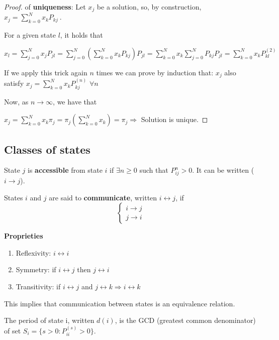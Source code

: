 	\begin{proof} of \textbf{uniqueness}:
		Let $x_j$ be a solution, so, by construction, $x_j = \sum_{k=0}^N x_k P_{kj} ~$.

		For a given state $l$, it holds that

		$x_l = \sum_{j=0}^N x_j P_{jl} =  \sum_{j=0}^N ( \sum_{k=0}^N x_k P_{kj} ) P_{jl} =  \sum_{k=0}^N x_k \sum_{j=0}^N P_{kj} P_{jl} = \sum_{k=0}^N x_k P_{kl}^{(2)}$

		If we apply this trick again $n$ times we can prove by induction that:
		$x_j$ also satisfy $ x_j = \sum_{k=0}^N x_k P_{kj}^(n) $ \quad  $\forall n $

		Now, as $n \to \infty$, we have that

		$x_j = \sum_{k=0}^N x_k \pi_j = \pi_j (\sum_{k=0}^N x_k) = \pi_j  \Rightarrow $ Solution is unique.
	\end{proof}

\subsection{Classes of states}
	\begin{definition}
		State $j$ is {\bfseries accessible} from state $i$ if $\exists n \geq 0$ such that $P_{ij}^n > 0$. It can be written ($i \rightarrow j$).
	\end{definition}

	\begin{definition}
		States $i$ and $j$ are said to {\bfseries communicate}, written $ i \leftrightarrow j$, if
		$$\left\{\begin{matrix}
			i \rightarrow j \\
			j \rightarrow i
			\end{matrix}\right.$$
	\end{definition}

	{\bfseries Proprieties}
	\begin{enumerate}
		\item Reflexivity: \quad $i \leftrightarrow i$
		\item Symmetry: \quad if $i \leftrightarrow j$ then $j \leftrightarrow i$
		\item Transitivity: \quad if $i \leftrightarrow j$ and $j \leftrightarrow k \Rightarrow i \leftrightarrow k$
	\end{enumerate}
	This implies that communication between states is an equivalence relation.

	\begin{definition}[Periodicity]
		The period of state i, written $d(i)$, is the GCD (greatest common denominator) of set $S_i = \{ s>0 : P_{ii}^{(s)} >0 \}$.
	\end{definition}

